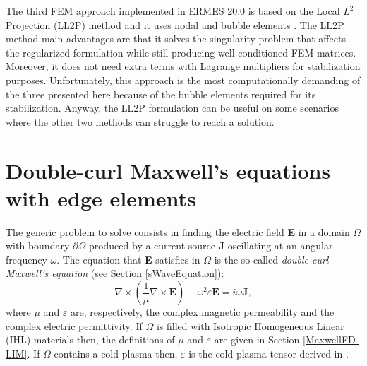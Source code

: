 The third FEM approach implemented in ERMES 20.0 is based on the Local $L^{2}$ Projection (LL2P) method and it uses nodal and bubble elements \cite{L2P-BE, L2P-BE-P}. The LL2P method main advantages are that it solves the singularity problem that affects the regularized formulation while still producing well-conditioned FEM matrices. Moreover, it does not need extra terms with Lagrange multipliers for stabilization purposes. Unfortunately, this approach is the most computationally demanding of the three presented here because of the bubble elements required for its stabilization. Anyway, the LL2P formulation can be useful on some scenarios where the other two methods can struggle to reach a solution. 

\section{Double-curl Maxwell's equations with edge elements}\label{DoubleCurlEdge}

The generic problem to solve consists in finding the electric field \textbf{E} in a domain $\Omega$ with boundary $\partial\Omega$ produced by a current source \textbf{J} oscillating at an angular frequency $\omega$. The equation that \textbf{E} satisfies in $\Omega$ is the so-called \emph{double-curl Maxwell's equation} (see Section \ref{sWaveEquation}):
\begin{equation}\label{CurlCurlME}
	\nabla\times\left(\frac{1}{\mu}\nabla\times\mathbf{E}\right) - \omega^{2}\varepsilon\mathbf{E} = i\omega\mathbf{J},
\end{equation}
where $\mu$ and $\varepsilon$ are, respectively, the complex magnetic permeability and the complex electric permittivity. If $\Omega$ is filled with Isotropic Homogeneous Linear (IHL) materials then, the definitions of $\mu$ and $\varepsilon$ are given in Section \ref{MaxwellFD-LIM}. If $\Omega$ contains a cold plasma then, $\varepsilon$ is the cold plasma tensor derived in \cite{Swanson, Stix}. 

